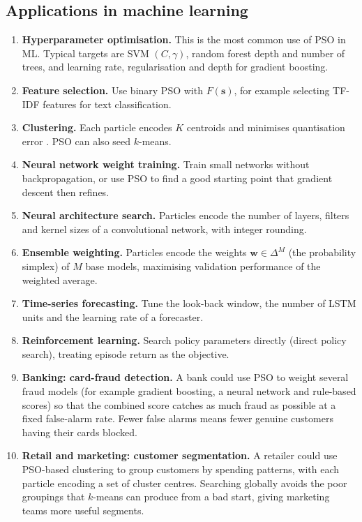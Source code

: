\documentclass[11pt,a4paper]{article}
\newcommand{\vect}[1]{\mathbf{#1}}
\begin{document}
\subsection{Applications in machine learning}

\begin{enumerate}
  \item \textbf{Hyperparameter optimisation.} This is the most common use of PSO in ML. Typical targets are SVM $(C, \gamma)$, random forest depth and number of trees, and learning rate, regularisation and depth for gradient boosting.
  \item \textbf{Feature selection.} Use binary PSO with $F(\vect{s})$, for example selecting TF-IDF features for text classification.
  \item \textbf{Clustering.} Each particle encodes $K$ centroids and minimises quantisation error \citep{vandermerwe2003}. PSO can also seed $k$-means.
  \item \textbf{Neural network weight training.} Train small networks without backpropagation, or use PSO to find a good starting point that gradient descent then refines.
  \item \textbf{Neural architecture search.} Particles encode the number of layers, filters and kernel sizes of a convolutional network, with integer rounding.
  \item \textbf{Ensemble weighting.} Particles encode the weights $\vect{w} \in \Delta^{M}$ (the probability simplex) of $M$ base models, maximising validation performance of the weighted average.
  \item \textbf{Time-series forecasting.} Tune the look-back window, the number of LSTM units and the learning rate of a forecaster.
  \item \textbf{Reinforcement learning.} Search policy parameters directly (direct policy search), treating episode return as the objective.
  \item \textbf{Banking: card-fraud detection.} A bank could use PSO to weight several fraud models (for example gradient boosting, a neural network and rule-based scores) so that the combined score catches as much fraud as possible at a fixed false-alarm rate. Fewer false alarms means fewer genuine customers having their cards blocked.
  \item \textbf{Retail and marketing: customer segmentation.} A retailer could use PSO-based clustering to group customers by spending patterns, with each particle encoding a set of cluster centres. Searching globally avoids the poor groupings that $k$-means can produce from a bad start, giving marketing teams more useful segments.
\end{enumerate}
\end{document}
